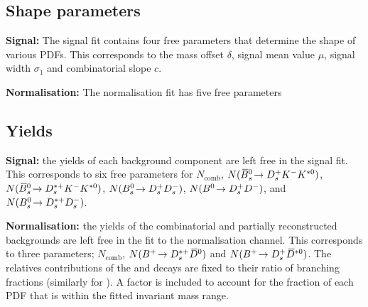 \subsection{Shape parameters}
\begin{description}
\item \textbf{Signal:} The signal fit contains four free parameters that determine the shape of various PDFs. This corresponds to the mass offset $\delta$, signal mean value $\mu$, signal width $\sigma_{1}$ and combinatorial slope $c$.
\item \textbf{Normalisation:} The normalisation fit has five free parameters  
\end{description}

\subsection{Yields}
\begin{description}

\item \textbf{Signal:} the yields of each background component are left free in the signal fit. This corresponds to six free parameters for $N_{\text{comb}}$, $N({{\kern 0.18em\overline{\kern -0.18em B}{}}{}^0_{s}}\!\rightarrow {\ensuremath{{D}^+_{s}}}{\ensuremath{{K}^-}}{\ensuremath{{K}^{*0}}})$, $N({{\kern 0.18em\overline{\kern -0.18em B}{}}{}^0_{s}}\!\rightarrow {\ensuremath{{D}^{*+}_{s}}}{\ensuremath{{K}^-}}{\ensuremath{{K}^{*0}}})$, $N({{B}^0_{s}}\!\rightarrow {\ensuremath{{D}^+_{s}}}{\ensuremath{{D}^-_{s}}})$, $N({{B}^0}\!\rightarrow {\ensuremath{{D}^+_{s}}}{\ensuremath{{D}^-}})$, and $N({{B}^0_{s}}\!\rightarrow {\ensuremath{{D}^{*+}_{s}}}{\ensuremath{{D}^-_{s}}})$.

\item \textbf{Normalisation:} the yields of the combinatorial and partially reconstructed backgrounds are left free in the fit to the normalisation channel. This corresponds to three parameters; $N_{\text{comb}}$, $N({{{B}^+}}\!\rightarrow {\ensuremath{{D}^{*+}_{s}}}{\ensuremath{{\kern 0.2em\overline{\kern -0.2em D}{}}{}^0}})$ and $N({{{B}^+}}\!\rightarrow {\ensuremath{{D}^+_{s}}}{\ensuremath{{\kern 0.2em\overline{\kern -0.2em D}{}}{}^{*0}}})$. The relatives contributions of the \decay{\Dssp}{\Dsp\piz} and \decay{\Dssp}{\Dsp\Pgamma} decays are fixed to their ratio of branching fractions (similarly for \Dstarzb). A factor is included to account for the fraction of each PDF that is within the fitted \Bp invariant mass range.
\end{description}

